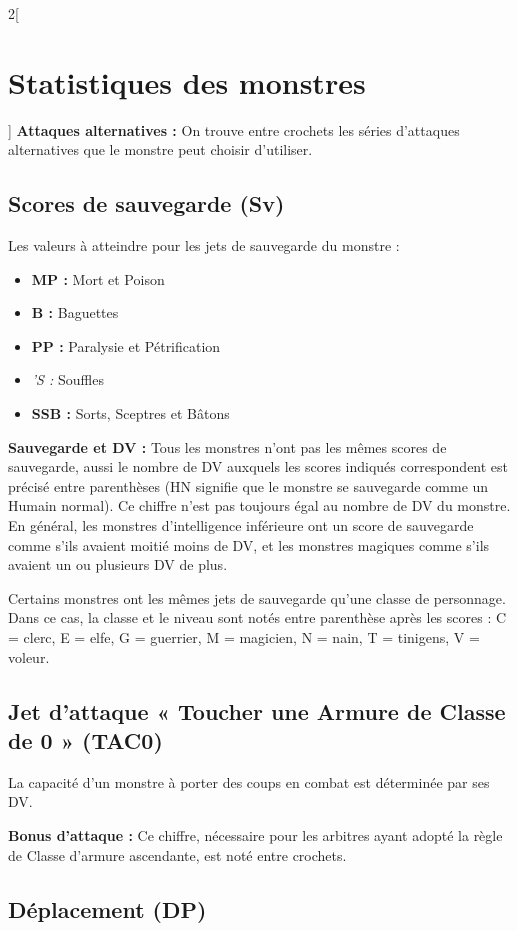 \begin{multicols}{2}[\section*{Statistiques des monstres}\label{statistiques-des-monstres}]
\textbf{Attaques alternatives :} On trouve entre crochets les séries
d'attaques alternatives que le monstre peut choisir d'utiliser.

\subsection*{Scores de sauvegarde (Sv)}\label{scores-de-sauvegarde-sv}

Les valeurs à atteindre pour les jets de sauvegarde du monstre :

\begin{itemize}
\tightlist
\item
  \textbf{MP :} Mort et Poison
\item
  \textbf{B :} Baguettes
\item
  \textbf{PP :} Paralysie et Pétrification
\item
  \emph{'S :} Souffles
\item
  \textbf{SSB :} Sorts, Sceptres et Bâtons
\end{itemize}

\textbf{Sauvegarde et DV :} Tous les monstres n'ont pas les mêmes scores
de sauvegarde, aussi le nombre de DV auxquels les scores indiqués
correspondent est précisé entre parenthèses (HN signifie que le monstre
se sauvegarde comme un Humain normal). Ce chiffre n'est pas toujours
égal au nombre de DV du monstre. En général, les monstres d'intelligence
inférieure ont un score de sauvegarde comme s'ils avaient moitié moins
de DV, et les monstres magiques comme s'ils avaient un ou plusieurs DV
de plus.

Certains monstres ont les mêmes jets de sauvegarde qu'une classe de
personnage. Dans ce cas, la classe et le niveau sont notés entre
parenthèse après les scores : C = clerc, E = elfe, G = guerrier, M =
magicien, N = nain, T = tinigens, V = voleur.

\subsection*{Jet d'attaque « Toucher une Armure de Classe de 0 » (TAC0)}\label{jet-dattaque-toucher-une-armure-de-classe-de-0-tac0}

La capacité d'un monstre à porter des coups en combat est déterminée par
ses DV.

\textbf{Bonus d'attaque :} Ce chiffre, nécessaire pour les arbitres
ayant adopté la règle de Classe d'armure ascendante, est noté entre
crochets.

\subsection*{Déplacement (DP)}\label{duxe9placement-dp}


\end{multicols}
